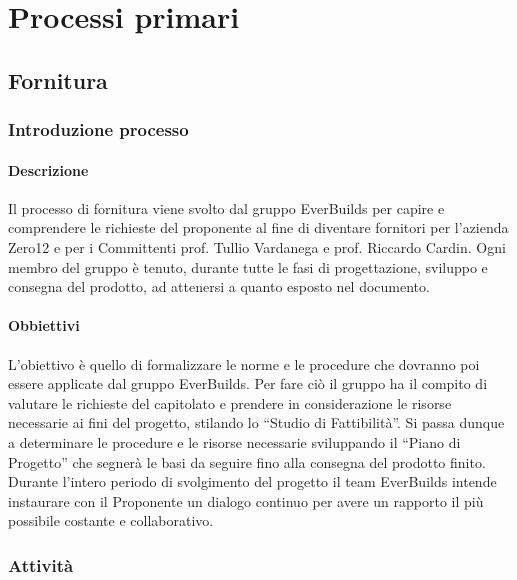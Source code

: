 \section{Processi primari}
	\subsection{Fornitura}
		\subsubsection{Introduzione processo}
			\paragraph{Descrizione}
				Il processo di fornitura viene svolto dal gruppo EverBuilds per capire e comprendere le richieste del proponente al fine di diventare fornitori per l’azienda Zero12 e per i Committenti prof. Tullio Vardanega e prof. Riccardo Cardin. Ogni membro del gruppo è tenuto, durante tutte le fasi di progettazione, sviluppo e consegna del prodotto, ad attenersi a quanto esposto nel documento.\\
			\paragraph{Obbiettivi}
				L’obiettivo è quello di formalizzare le norme e le procedure che dovranno poi essere applicate dal gruppo EverBuilds. Per fare ciò il gruppo ha il compito di valutare le richieste del capitolato e prendere in considerazione le risorse necessarie ai fini del progetto, stilando lo “Studio di Fattibilità”. Si passa dunque a determinare le procedure e le risorse necessarie sviluppando il “Piano di Progetto” che segnerà le basi da seguire fino alla consegna del prodotto finito.\\
				Durante l’intero periodo di svolgimento del progetto il team EverBuilds intende instaurare con il Proponente un dialogo continuo per avere un rapporto il più possibile costante e collaborativo.\\
		\subsubsection{Attività}

